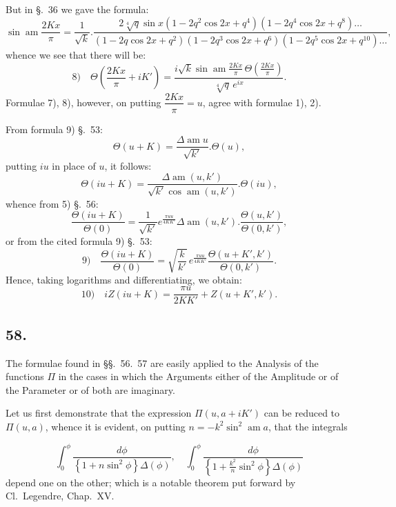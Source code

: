 \documentclass{article}
\begin{document}
But in §.\ 36 we gave the formula:
\[
\sin\operatorname{am}\frac{2Kx}{\pi}=\frac{1}{\sqrt{k}}.\frac{2\sqrt[4]{q}\sin x(1-2q^{2}\cos2x+q^{4})(1-2q^{4}\cos2x+q^{8})\ldots}{(1-2q\cos2x+q^{2})(1-2q^{3}\cos2x+q^{6})(1-2q^{5}\cos2x+q^{10})\ldots},
\]
whence we see that there will be:
\[
\text{8)}\quad \Theta\left(\frac{2Kx}{\pi}+iK'\right)=\frac{i\sqrt{k}\sin\operatorname{am}\frac{2Kx}{\pi}\,\Theta\left(\frac{2Kx}{\pi}\right)}{\sqrt[4]{q}\,e^{ix}}.
\]
Formulae 7), 8), however, on putting $\dfrac{2Kx}{\pi}=u$, agree with formulae 1), 2).

From formula 9) §.\ 53:
\[
\Theta(u+K)=\frac{\Delta\operatorname{am}u}{\sqrt{k'}}.\Theta(u),
\]
putting $iu$ in place of $u$, it follows:
\[
\Theta(iu+K)=\frac{\Delta\operatorname{am}(u,k')}{\sqrt{k'}\cos\operatorname{am}(u,k')}.\Theta(iu),
\]
whence from 5) §.\ 56:
\[
\frac{\Theta(iu+K)}{\Theta(0)}=\frac{1}{\sqrt{k'}}e^{\frac{\pi uu}{4KK'}}\Delta\operatorname{am}(u,k').\frac{\Theta(u,k')}{\Theta(0,k')},
\]
or from the cited formula 9) §.\ 53:
\[
\text{9)}\quad \frac{\Theta(iu+K)}{\Theta(0)}=\sqrt{\frac{k}{k'}}\,e^{\frac{\pi uu}{4KK'}}\frac{\Theta(u+K',k')}{\Theta(0,k')}.
\]
Hence, taking logarithms and differentiating, we obtain:
\[
\text{10)}\quad iZ(iu+K)=\frac{\pi u}{2KK'}+Z(u+K',k').
\]

\subsection*{58.}

The formulae found in §§.\ 56.\ 57 are easily applied to the Analysis of the functions $\Pi$ in the cases in which the Arguments either of the Amplitude or of the Parameter or of both are imaginary.

Let us first demonstrate that the expression $\Pi(u,a+iK')$ can be reduced to $\Pi(u,a)$, whence it is evident, on putting $n=-k^{2}\sin^{2}\operatorname{am}a$, that the integrals

\[
\int_{0}^{\phi}\frac{d\phi}{\left\{1+n\sin^{2}\phi\right\}\Delta(\phi)},\quad \int_{0}^{\phi}\frac{d\phi}{\left\{1+\frac{k^{2}}{n}\sin^{2}\phi\right\}\Delta(\phi)}
\]
depend one on the other; which is a notable theorem put forward by Cl.\ Legendre, Chap.\ XV.
\end{document}
